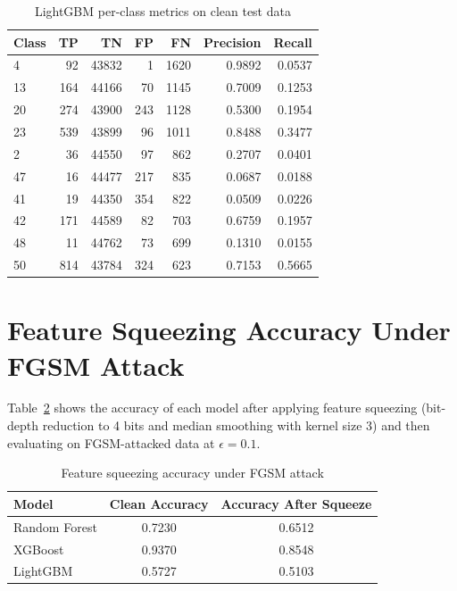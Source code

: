 \documentclass[12pt,a4paper,oneside]{report}
\begin{document}
\begin{appendices}
\begin{table}[H]
    \centering
    \caption[LightGBM confusion metrics (top 10)]{LightGBM per-class metrics on clean test data}\label{tab:confusion_lgbm}
    \begin{tabular}{lrrrrrr}
        \toprule
        Class & TP & TN & FP & FN & Precision & Recall \\
        \midrule
        4  & 92  & 43832 & 1   & 1620 & 0.9892 & 0.0537 \\
        13 & 164 & 44166 & 70  & 1145 & 0.7009 & 0.1253 \\
        20 & 274 & 43900 & 243 & 1128 & 0.5300 & 0.1954 \\
        23 & 539 & 43899 & 96  & 1011 & 0.8488 & 0.3477 \\
        2  & 36  & 44550 & 97  & 862  & 0.2707 & 0.0401 \\
        47 & 16  & 44477 & 217 & 835  & 0.0687 & 0.0188 \\
        41 & 19  & 44350 & 354 & 822  & 0.0509 & 0.0226 \\
        42 & 171 & 44589 & 82  & 703  & 0.6759 & 0.1957 \\
        48 & 11  & 44762 & 73  & 699  & 0.1310 & 0.0155 \\
        50 & 814 & 43784 & 324 & 623  & 0.7153 & 0.5665 \\
        \bottomrule
    \end{tabular}
\end{table}

\section{Feature Squeezing Accuracy Under FGSM Attack}

Table~\ref{tab:feat_squeeze} shows the accuracy of each model after applying feature squeezing (bit-depth reduction to 4 bits and median smoothing with kernel size 3) and then evaluating on FGSM-attacked data at $\epsilon = 0.1$.

\begin{table}[H]
    \centering
    \caption[Feature squeezing accuracy]{Feature squeezing accuracy under FGSM attack}\label{tab:feat_squeeze}
    \begin{tabular}{lcc}
        \toprule
        Model & Clean Accuracy & Accuracy After Squeeze \\
        \midrule
        Random Forest & 0.7230 & 0.6512 \\
        XGBoost       & 0.9370 & 0.8548 \\
        LightGBM      & 0.5727 & 0.5103 \\
        \bottomrule
    \end{tabular}
\end{table}


\end{appendices}
\end{document}
